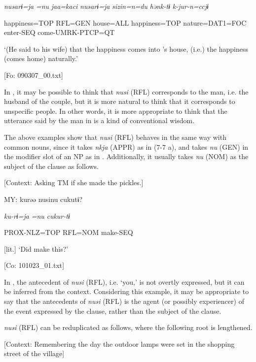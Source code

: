     \textit{nusarɨ=ja}  \textit{=nu}  \textit{jaa=kaci}  \textit{nusarɨ=ja}  \textit{sizin=n=du} \textit{hənk-tɨ}  \textit{k-jur-n=ccjɨ}
                                                                                                    
    happiness=TOP  RFL=GEN  house=ALL  happiness=TOP  nature=DAT1=FOC  enter-SEQ  come-UMRK-PTCP=QT

    ‘(He said to his wife) that the happiness comes into ’s house, (i.e.) the happiness (comes home) naturally.’

    [Fo: 090307\_00.txt]
\z

In , it may be possible to think that \textit{nusi} (RFL) corresponds to the man, i.e. the husband of the couple, but it is more natural to think that it corresponds to unspecific people. In other words, it is more appropriate to think that the utterance said by the man in  is a kind of conventional wisdom.

  The above examples show that \textit{nusi} (RFL) behaves in the same way with common nouns, since it takes \textit{nkja} (APPR) as in (7-7 a), and takes \textit{nu} (GEN) in the modifier slot of an NP as in . Additionally, it usually takes \textit{nu} (NOM) as the subject of the clause as follows.

\ea \label{ex:7:9}  [Context: Asking TM if she made the pickles.]

  MY:  kurəə  nusinu  cukutɨ?

    \textit{ku-rɨ=ja}  \textit{=nu}  \textit{cukur-tɨ}

    PROX-NLZ=TOP  RFL=NOM  make-SEQ

    [lit.] ‘Did  make this?’

    [Co: 101023\_01.txt]
\z

In , the antecedent of \textit{nusi} (RFL), i.e. ‘you,’ is not overtly expressed, but it can be inferred from the context. Considering this example, it may be appropriate to say that the antecedents of \textit{nusi} (RFL) is the agent (or possibly experiencer) of the event expressed by the clause, rather than the subject of the clause.

\textit{nusi} (RFL) can be reduplicated as follows, where the following root is lengthened.

\ea \label{ex:7:10}  [Context: Remembering the day the outdoor lamps were set in the shopping street of the village]

